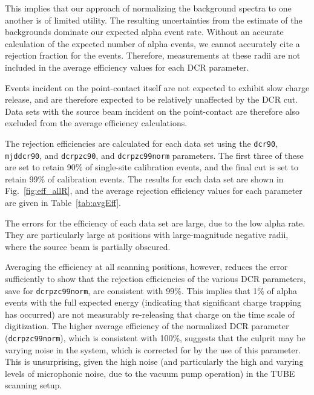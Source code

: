 This implies that our approach of normalizing the background spectra to one another is of limited utility.  The resulting uncertainties from the estimate of the backgrounds dominate our expected alpha event rate. Without an accurate calculation of the expected number of alpha events, we cannot accurately cite a rejection fraction for the events. Therefore, measurements at these radii are not included in the average efficiency values for each DCR parameter. 

Events incident on the point-contact itself are not expected to exhibit slow charge release, and are therefore expected to be relatively unaffected by the DCR cut. Data sets with the source beam incident on the point-contact are therefore also excluded from the average efficiency calculations. 

The rejection efficiencies are calculated for each data set using the {\tt dcr90}, {\tt mjddcr90}, and {\tt dcrpzc90}, and {\tt dcrpzc99norm} parameters. The first three of these are set to retain 90\% of single-site calibration events, and the final cut is set to retain 99\% of calibration events. The results for each data set are shown in Fig.~\ref{fig:eff_allR}, and the average rejection efficiency values for each parameter are given in Table~\ref{tab:avgEff}. 

The errors for the efficiency of each data set are large, due to the low alpha rate. They are particularly large at positions with large-magnitude negative radii, where the source beam is partially obscured. 

Averaging the efficiency at all scanning positions, however, reduces the error sufficiently to show that the rejection efficiencies of the various DCR parameters, save for {\tt dcrpzc99norm}, are consistent with 99\%. This implies that 1\% of alpha events with the full expected energy (indicating that significant charge trapping has occurred) are not measurably re-releasing that charge on the time scale of digitization. The higher average efficiency of the normalized DCR parameter ({\tt dcrpzc99norm}), which is consistent with 100\%, suggests that the culprit may be varying noise in the system, which is corrected for by the use of this parameter. This is unsurprising, given the high noise (and particularly the high and varying levels of microphonic noise, due to the vacuum pump operation) in the TUBE scanning setup. 

